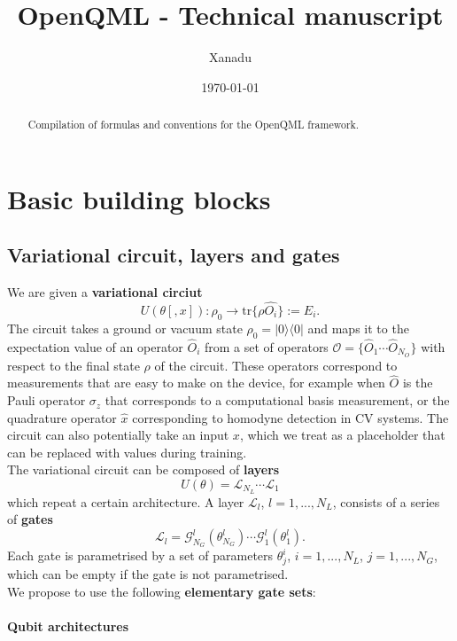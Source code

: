 \documentclass[amsmath,amssymb,aps,pra,10pt,twocolumn,groupedaddress,nofootinbib]{revtex4-1}
\newcommand{\ketbra}[2]{|#1\rangle\langle#2|}
\newcommand{\x}{\hat{x}}
\newcommand{\tr}{\mathrm{tr}}
\renewcommand{\L}{\mathcal{L}}
\newcommand{\G}{\mathcal{G}}
\begin{document}
\title{OpenQML - Technical manuscript}
\author{Xanadu}
\date{\today}

\begin{abstract}
Compilation of formulas and conventions for the OpenQML framework.
\end{abstract}

\maketitle


\section{Basic building blocks}

\subsection{Variational circuit, layers and gates}

We are given a \textbf{variational circiut} 
\[ U (\theta[, x]): \rho_0 \rightarrow \tr \{ \rho \hat{O_i} \} := E_i. \]
The circuit takes a ground or vacuum state $\rho_0 = \ketbra{0}{0}$ and maps it to the expectation value of an operator $\hat{O}_i$ from a set of operators $\mathcal{O} = \{\hat{O}_1 \cdots \hat{O}_{N_O}\}$ with respect to the final state $\rho$ of the circuit. These operators correspond to measurements that are easy to make on the device, for example when $\hat{O}$ is the Pauli operator $\sigma_z$ that corresponds to a computational basis measurement, or the quadrature operator $\x$ corresponding to homodyne detection in CV systems. The circuit can also potentially take an input $x$, which we treat as a placeholder that can be replaced with values during training.\\

The variational circuit can be composed of \textbf{layers} 
\[ U (\theta) = \L_{N_L} \cdots \L_{1}\]
which repeat a certain architecture. A layer $\L_l$, $l=1,...,N_L$, consists of a series of \textbf{gates}
\[\L_l = \G^l_{N_G}(\theta^l_{N_G}) \cdots \G^l_1(\theta^l_1). \]
Each gate is parametrised by a set of parameters $\theta^i_j$, $i = 1,...,N_L$, $j=1,...,N_G$, which can be empty if the gate is not parametrised. \\

We propose to use the following \textbf{elementary gate sets}:

\paragraph{Qubit architectures}
\end{document}
